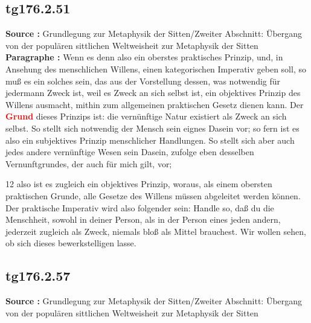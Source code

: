 \documentclass[a4paper,12pt,twoside]{book}
\newcommand{\match}[1]{\textcolor{red}{\textbf{#1}}}
\begin{document}
	\subsection*{tg176.2.51} 
	\textbf{Source : }Grundlegung zur Metaphysik der Sitten/Zweiter Abschnitt: Übergang von der populären sittlichen Weltweisheit zur Metaphysik der Sitten\\  
	
	\noindent\textbf{Paragraphe : }Wenn es denn also ein oberstes praktisches Prinzip, und, in Ansehung des menschlichen Willens, einen kategorischen Imperativ geben soll, so muß es ein solches sein, das aus der Vorstellung dessen, was notwendig für jedermann Zweck ist, weil es Zweck an sich selbst ist, ein objektives Prinzip des Willens ausmacht, mithin zum allgemeinen praktischen Gesetz dienen kann. Der \match{Grund} dieses Prinzips ist: die vernünftige Natur existiert als Zweck an sich selbst. So stellt sich notwendig der Mensch sein eignes Dasein vor; so fern ist es also ein subjektives Prinzip menschlicher Handlungen. So stellt sich aber auch jedes andere vernünftige Wesen sein Dasein, zufolge eben desselben Vernunftgrundes, der auch für mich gilt, vor;
	
	
	12
	also ist es zugleich ein objektives Prinzip, woraus, als einem obersten praktischen Grunde, alle Gesetze des Willens müssen abgeleitet werden können. Der praktische Imperativ wird also folgender sein: Handle so, daß du die Menschheit, sowohl in deiner Person, als in der Person eines jeden andern, jederzeit zugleich als Zweck, niemals bloß als Mittel brauchest. Wir wollen sehen, ob sich dieses bewerkstelligen lasse. 
	
	\subsection*{tg176.2.57} 
	\textbf{Source : }Grundlegung zur Metaphysik der Sitten/Zweiter Abschnitt: Übergang von der populären sittlichen Weltweisheit zur Metaphysik der Sitten\\  
	
\end{document}
